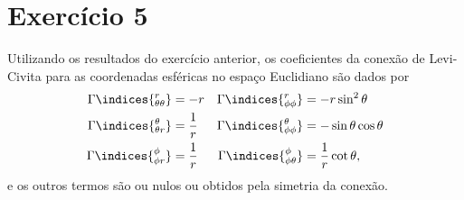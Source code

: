 \section*{Exercício 5}
Utilizando os resultados do exercício anterior, os coeficientes da conexão de Levi-Civita para as coordenadas esféricas no espaço Euclidiano são dados por
\begin{align*}
    \Gamma\indices{^r_{\theta\theta}} &= -r & \Gamma\indices{^r_{\phi\phi}} &= -r\sin^2\theta\\
    \Gamma\indices{^\theta_{\theta r}} &= \frac{1}{r} & \Gamma\indices{^\theta_{\phi\phi}} &= -\sin\theta\cos\theta\\
    \Gamma\indices{^\phi_{\phi r}} &= \frac{1}{r} & \Gamma\indices{^\phi_{\phi\theta}} &= \frac{1}{r} \cot\theta,
\end{align*}
e os outros termos são ou nulos ou obtidos pela simetria da conexão.

